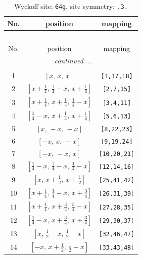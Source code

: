 \documentclass[fleqn,8pt]{jsarticle}
\begin{document}
\begin{longtable}{ccc}
\caption{Wyckoff site: {\tt 64g}, site symmetry: {\tt .3.}}
 \\
 \hline \hline
No. & position & mapping \\ \hline \endfirsthead

\multicolumn{2}{l}{\tablename\ \thetable{}} \\
 \hline \hline
No. & position & mapping \\ \hline \endhead

 \hline \hline
\multicolumn{2}{r}{\footnotesize\it continued ...} \\ \endfoot

 \hline \hline
\multicolumn{2}{r}{} \\ \endlastfoot

1 & $\left[ x,\, x,\, x \right]$ & {\tt [1,17,18]} \\ \hline
2 & $\left[ x + \frac{1}{4},\, \frac{1}{4} - x,\, x + \frac{1}{4} \right]$ & {\tt [2,7,15]} \\ \hline
3 & $\left[ x + \frac{1}{4},\, x + \frac{1}{4},\, \frac{1}{4} - x \right]$ & {\tt [3,4,11]} \\ \hline
4 & $\left[ \frac{1}{4} - x,\, x + \frac{1}{4},\, x + \frac{1}{4} \right]$ & {\tt [5,6,13]} \\ \hline
5 & $\left[ x,\, - x,\, - x \right]$ & {\tt [8,22,23]} \\ \hline
6 & $\left[ - x,\, x,\, - x \right]$ & {\tt [9,19,24]} \\ \hline
7 & $\left[ - x,\, - x,\, x \right]$ & {\tt [10,20,21]} \\ \hline
8 & $\left[ \frac{1}{4} - x,\, \frac{1}{4} - x,\, \frac{1}{4} - x \right]$ & {\tt [12,14,16]} \\ \hline
9 & $\left[ x,\, x + \frac{1}{2},\, x + \frac{1}{2} \right]$ & {\tt [25,41,42]} \\ \hline
10 & $\left[ x + \frac{1}{4},\, \frac{3}{4} - x,\, x + \frac{3}{4} \right]$ & {\tt [26,31,39]} \\ \hline
11 & $\left[ x + \frac{1}{4},\, x + \frac{3}{4},\, \frac{3}{4} - x \right]$ & {\tt [27,28,35]} \\ \hline
12 & $\left[ \frac{1}{4} - x,\, x + \frac{3}{4},\, x + \frac{3}{4} \right]$ & {\tt [29,30,37]} \\ \hline
13 & $\left[ x,\, \frac{1}{2} - x,\, \frac{1}{2} - x \right]$ & {\tt [32,46,47]} \\ \hline
14 & $\left[ - x,\, x + \frac{1}{2},\, \frac{1}{2} - x \right]$ & {\tt [33,43,48]} \\ \hline

\end{longtable}
\end{document}
